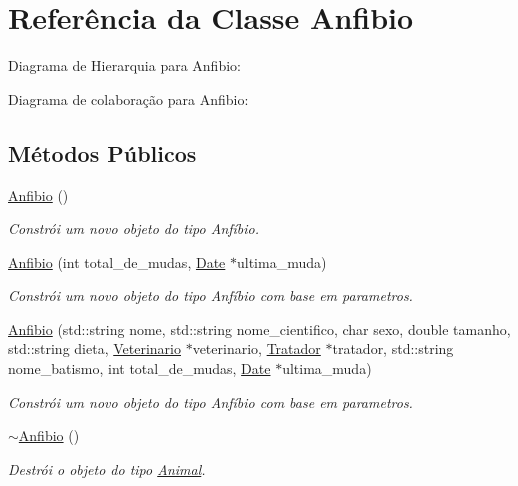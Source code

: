 \hypertarget{classAnfibio}{}\section{Referência da Classe Anfibio}
\label{classAnfibio}


Diagrama de Hierarquia para Anfibio\+:


Diagrama de colaboração para Anfibio\+:
\subsection*{Métodos Públicos}
\begin{DoxyCompactItemize}
\item 
\mbox{\label{classAnfibio_a91fd9b91b9124ab41ea9e9c9bb013476}} 
\hyperlink{classAnfibio_a91fd9b91b9124ab41ea9e9c9bb013476}{Anfibio} ()
\begin{DoxyCompactList}\small\item\em Constrói um novo objeto do tipo Anfíbio. \end{DoxyCompactList}\item 
\hyperlink{classAnfibio_a488a2d9bfe450ebd8f0a19c5ec4eea32}{Anfibio} (int total\+\_\+de\+\_\+mudas, \hyperlink{classDate}{Date} $\ast$ultima\+\_\+muda)
\begin{DoxyCompactList}\small\item\em Constrói um novo objeto do tipo Anfíbio com base em parametros. \end{DoxyCompactList}\item 
\hyperlink{classAnfibio_a8b72864faa207bd6e39c29bfc8559c02}{Anfibio} (std\+::string nome, std\+::string nome\+\_\+cientifico, char sexo, double tamanho, std\+::string dieta, \hyperlink{classVeterinario}{Veterinario} $\ast$veterinario, \hyperlink{classTratador}{Tratador} $\ast$tratador, std\+::string nome\+\_\+batismo, int total\+\_\+de\+\_\+mudas, \hyperlink{classDate}{Date} $\ast$ultima\+\_\+muda)
\begin{DoxyCompactList}\small\item\em Constrói um novo objeto do tipo Anfíbio com base em parametros. \end{DoxyCompactList}\item 
\mbox{\label{classAnfibio_a53bb71a1ed0e79c5fc41a62a0af9060c}} 
\hyperlink{classAnfibio_a53bb71a1ed0e79c5fc41a62a0af9060c}{$\sim$\+Anfibio} ()
\begin{DoxyCompactList}\small\item\em Destrói o objeto do tipo \hyperlink{classAnimal}{Animal}. \end{DoxyCompactList}\end{DoxyCompactItemize}
